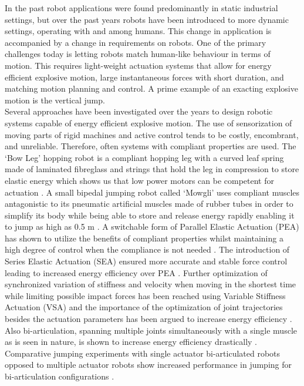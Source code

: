 \documentclass[letterpaper, 10 pt, conference]{ieeeconf}  %
\begin{document}
In the past robot applications were found predominantly in static industrial settings, but over the past years robots have been introduced to more dynamic settings, operating with and among humans. This change in application is accompanied by a change in requirements on robots. One of the primary challenges today is letting robots match human-like behaviour in terms of motion. This requires light-weight actuation systems that allow for energy efficient explosive motion, large  instantaneous  forces  with  short  duration, and matching motion planning and control. A prime example of an exacting explosive motion is the vertical jump.
\\
Several approaches have been investigated over the years to design robotic systems capable of energy efficient explosive motion. The use of sensorization of moving parts of rigid machines and active control tends to be costly, encombrant, and unreliable. Therefore, often systems with compliant properties are used. The `Bow Leg' hopping robot is a compliant hopping leg with a curved leaf spring made of laminated fibreglass and strings that hold the leg in compression to store elastic energy which shows us that low power motors  can  be  competent  for  actuation \cite{zeglin1999bow}. A small bipedal jumping robot called `Mowgli' uses compliant muscles antagonistic to its pneumatic artificial muscles made of rubber tubes in order to simplify its body while being able to store and release energy rapidly enabling it to jump as high as 0.5 m \cite{niiyama2007mowgli}. A switchable form of Parallel Elastic Actuation (PEA) has shown to utilize the benefits of compliant properties whilst maintaining a high degree of control when the compliance is not needed \cite{liu2015spear}. The introduction of Series Elastic Actuation (SEA) ensured more accurate and stable force control leading to increased energy efficiency over PEA \cite{pratt1995series,yesilevskiy2015comparison}.
Further optimization of synchronized variation of stiffness and velocity when moving
in the shortest time while limiting possible impact forces has been reached using Variable Stiffness Actuation (VSA) \cite{garabini2011optimality} and the importance of the optimization of joint trajectories besides the actuation parameters has been argued to increase energy efficiency \cite{velasco2013soft}. Also bi-articulation, spanning multiple joints simultaneously with a single muscle as is seen in nature, is shown to increase energy efficiency drastically \cite{schenau1989rotation,prilutsky1994tendon}. Comparative jumping experiments with single actuator bi-articulated robots opposed to multiple actuator robots show increased performance in jumping for bi-articulation configurations \cite{oshima2007jumping,babivc2009biarticulated,hyon2002development}. \\
\end{document}
